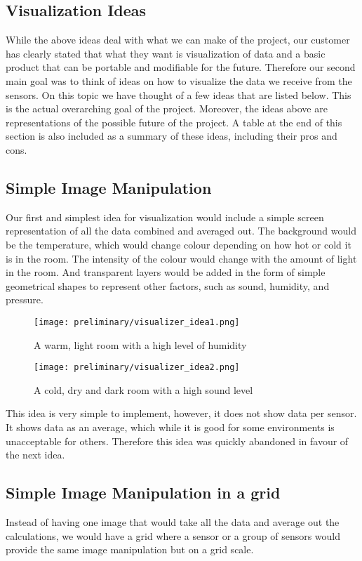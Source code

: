 \documentclass[../document]{subfiles}
\begin{document}
\subsection{Visualization Ideas}
While the above ideas deal with what we can make of the project, our customer has clearly stated that what they want is visualization of data and a basic product that can be portable and modifiable for the future. Therefore our second main goal was to think of ideas on how to visualize the data we receive from the sensors. On this topic we have thought of a few ideas that are listed below. This is the actual overarching goal of the project. Moreover, the ideas above are representations of the possible future of the project. A table at the end of this section is also included as a summary of these ideas, including their pros and cons.

\subsection{Simple Image Manipulation}
Our first and simplest idea for visualization would include a simple screen representation of all the data combined and averaged out. The background would be the temperature, which would change colour depending on how hot or cold it is in the room. The intensity of the colour would change with the amount of light in the room. And transparent layers would be added in the form of simple geometrical shapes to represent other factors, such as sound, humidity, and pressure.

\begin{figure}
\texttt{[image: preliminary/visualizer\_idea1.png]}
\caption{A warm, light room with a high level of humidity}
\end{figure}

\begin{figure}
\texttt{[image: preliminary/visualizer\_idea2.png]}
\caption{A cold, dry and dark room with a high sound level}
\end{figure}

This idea is very simple to implement, however, it does not show data per sensor. It shows data as an average, which while it is good for some environments is unacceptable for others. Therefore this idea was quickly abandoned in favour of the next idea.

\subsection{Simple Image Manipulation in a grid}
Instead of having one image that would take all the data and average out the calculations, we would have a grid where a sensor or a group of sensors would provide the same image manipulation but on a grid scale.
\end{document}
